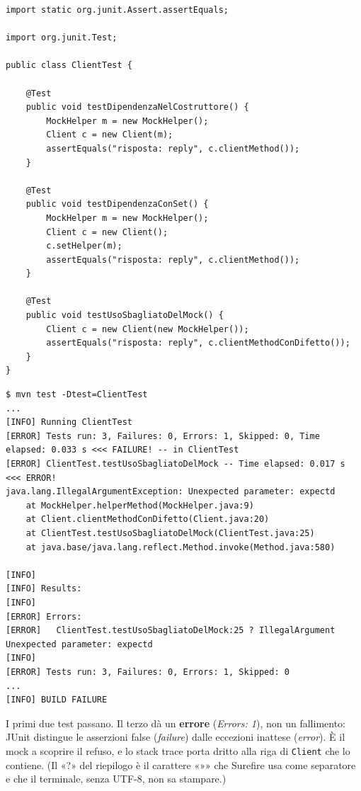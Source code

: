 \begin{lstlisting}[style=java, name=ClientTest.java]
import static org.junit.Assert.assertEquals;

import org.junit.Test;

public class ClientTest {

    @Test
    public void testDipendenzaNelCostruttore() {
        MockHelper m = new MockHelper();
        Client c = new Client(m);
        assertEquals("risposta: reply", c.clientMethod());
    }

    @Test
    public void testDipendenzaConSet() {
        MockHelper m = new MockHelper();
        Client c = new Client();
        c.setHelper(m);
        assertEquals("risposta: reply", c.clientMethod());
    }

    @Test
    public void testUsoSbagliatoDelMock() {
        Client c = new Client(new MockHelper());
        assertEquals("risposta: reply", c.clientMethodConDifetto());
    }
}
\end{lstlisting}

\begin{lstlisting}[style=shell, name=Terminale, deletekeywords={java}]
$ mvn test -Dtest=ClientTest
...
[INFO] Running ClientTest
[ERROR] Tests run: 3, Failures: 0, Errors: 1, Skipped: 0, Time elapsed: 0.033 s <<< FAILURE! -- in ClientTest
[ERROR] ClientTest.testUsoSbagliatoDelMock -- Time elapsed: 0.017 s <<< ERROR!
java.lang.IllegalArgumentException: Unexpected parameter: expectd
    at MockHelper.helperMethod(MockHelper.java:9)
    at Client.clientMethodConDifetto(Client.java:20)
    at ClientTest.testUsoSbagliatoDelMock(ClientTest.java:25)
    at java.base/java.lang.reflect.Method.invoke(Method.java:580)

[INFO]
[INFO] Results:
[INFO]
[ERROR] Errors:
[ERROR]   ClientTest.testUsoSbagliatoDelMock:25 ? IllegalArgument Unexpected parameter: expectd
[INFO]
[ERROR] Tests run: 3, Failures: 0, Errors: 1, Skipped: 0
...
[INFO] BUILD FAILURE
\end{lstlisting}

I primi due test passano. Il terzo dà un \textbf{errore} (\textit{Errors: 1}), non un fallimento: JUnit distingue le
asserzioni false (\textit{failure}) dalle eccezioni inattese (\textit{error}). È il mock a scoprire il refuso, e lo
stack trace porta dritto alla riga di \texttt{Client} che lo contiene. (Il «?» del riepilogo è il carattere «»» che
Surefire usa come separatore e che il terminale, senza UTF-8, non sa stampare.)

